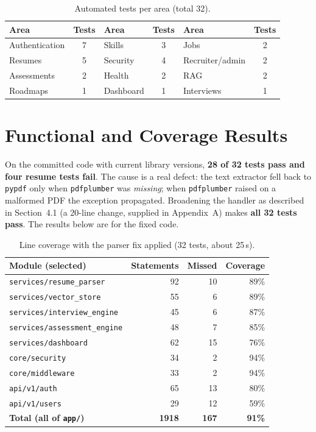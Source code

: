 \documentclass[openany]{tietreport}
\newcommand{\code}[1]{\texttt{\small #1}}
\begin{document}
\begin{table}[h]
\centering\small
\begin{tabular}{@{}lc@{\hspace{2em}}lc@{\hspace{2em}}lc@{}}
\toprule
\textbf{Area} & \textbf{Tests} & \textbf{Area} & \textbf{Tests} & \textbf{Area} & \textbf{Tests} \\
\midrule
Authentication & 7 & Skills & 3 & Jobs & 2 \\
Resumes & 5 & Security & 4 & Recruiter/admin & 2 \\
Assessments & 2 & Health & 2 & RAG & 2 \\
Roadmaps & 1 & Dashboard & 1 & Interviews & 1 \\
\bottomrule
\end{tabular}
\caption{Automated tests per area (total 32).}
\label{tab:tests}
\end{table}

\section{Functional and Coverage Results}
\label{sec:cov}
On the committed code with current library versions, \textbf{28 of 32 tests pass and four resume tests fail}. The cause is a real defect: the text extractor fell back to \code{pypdf} only when \code{pdfplumber} was \emph{missing}; when \code{pdfplumber} raised on a malformed PDF the exception propagated. Broadening the handler as described in Section~4.1 (a 20-line change, supplied in Appendix~A) makes \textbf{all 32 tests pass}. The results below are for the fixed code.

\begin{table}[h]
\centering\small
\begin{tabular}{@{}lrrr@{}}
\toprule
\textbf{Module (selected)} & \textbf{Statements} & \textbf{Missed} & \textbf{Coverage} \\
\midrule
\code{services/resume\_parser} & 92 & 10 & 89\% \\
\code{services/vector\_store} & 55 & 6 & 89\% \\
\code{services/interview\_engine} & 45 & 6 & 87\% \\
\code{services/assessment\_engine} & 48 & 7 & 85\% \\
\code{services/dashboard} & 62 & 15 & 76\% \\
\code{core/security} & 34 & 2 & 94\% \\
\code{core/middleware} & 33 & 2 & 94\% \\
\code{api/v1/auth} & 65 & 13 & 80\% \\
\code{api/v1/users} & 29 & 12 & 59\% \\
\midrule
\textbf{Total (all of \code{app/})} & \textbf{1918} & \textbf{167} & \textbf{91\%} \\
\bottomrule
\end{tabular}
\caption{Line coverage with the parser fix applied (32 tests, about 25\,s).}
\label{tab:cov}
\end{table}
\end{document}
